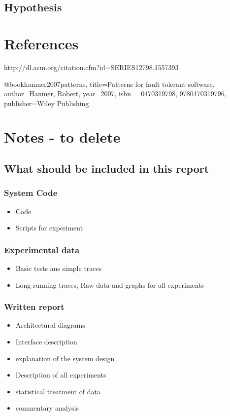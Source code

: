 \documentclass[a4paper]{article}
\begin{document}
\subsection{Hypothesis}

\section{References}


http://dl.acm.org/citation.cfm?id=SERIES12798.1557393

@book{hanmer2007patterns,
  title={Patterns for fault tolerant software},
  author={Hanmer, Robert},
  year={2007},
  isbn = {0470319798, 9780470319796},
  publisher={Wiley Publishing}
}

%

\section{Notes - to delete}

\subsection{What should be included in this report }

\subsubsection{System Code}
\begin{itemize}
\item Code
\item Scripts for experiment
\end{itemize}

\subsubsection{Experimental data}
\begin{itemize}
\item Basic tests ans simple traces
\item Long running traces, Raw data and graphs for all experiments
\end{itemize}

\subsubsection{Written report}
\begin{itemize}
\item Architectural  diagrams
\item Interface description
\item explanation of the system design
\item Description of all experiments
\item statistical treatment of data
\item commentary analysis
\end{itemize}
\end{document}
